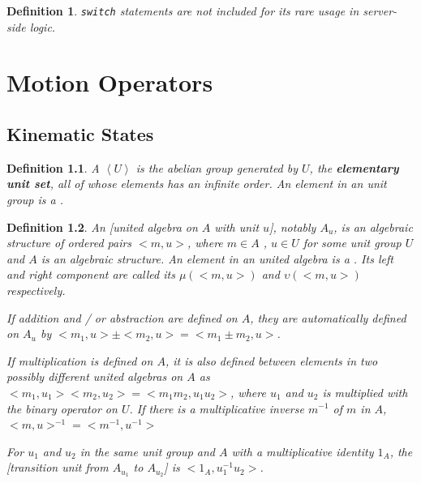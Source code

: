 \documentclass{book}
\newtheorem{definition}{Definition}
\theoremstyle{definition}\newtheorem{mechanism}{Mechanism}
\theoremstyle{remark}\newtheorem*{remark}{Remark}
\begin{document}
\begin{definition}
	\texttt{switch} statements are not included for its rare usage in server-side logic.
\end{definition}



\chapter{Motion Operators}

\section{Kinematic States}

\begin{definition}
	 A  $\left<U\right>$ is the abelian group generated by $U$, the {\bf{elementary unit set}}, all of whose elements has an infinite order. An element in an unit group is a .
\end{definition}

\begin{definition}
	An [united algebra on $A$ with unit $u$], notably $A_u$, is an algebraic structure of ordered pairs $<m, u>$, where $m \in A$ , $u\in U$ for some unit group $U$ and $A$ is an algebraic structure. An element in an united algebra is a . Its left and right component are called its  $\mu(<m, u>)$ and  $\upsilon(<m, u>)$ respectively.
	
	If addition and / or abstraction are defined on $A$, they are automatically defined on $A_u$ by $<m_1, u> \pm <m_2, u> = <m_1 \pm m_2, u>$.
	
	If multiplication is defined on $A$, it is also defined between elements in two possibly different united algebras on $A$ as $<m_1, u_1><m_2, u_2> = <m_1 m_2, u_1 u_2>$, where $u_1$ and $u_2$ is multiplied with the binary operator on $U$. If there is a multiplicative inverse $m^{-1}$ of $m$ in $A$, $<m, u>^{-1} = <m^{-1}, u^{-1}>$
	
	For $u_1$ and $u_2$ in the same unit group and $A$ with a multiplicative identity $1_A$, the [transition unit from $A_{u_1}$ to $A_{u_2}$] is $<1_A, u_1^{-1}u_2>$.
\end{definition}
\end{document}
